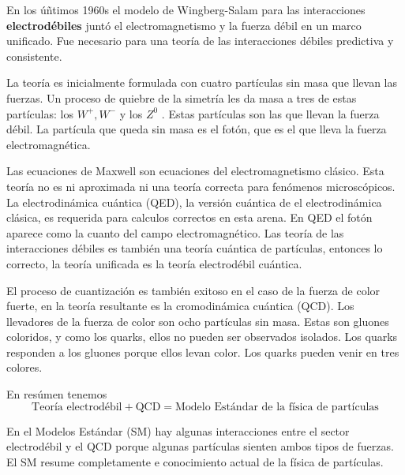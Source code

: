 En los úñtimos 1960s el modelo de Wingberg-Salam para las interacciones \textbf{electrodébiles} juntó el electromagnetismo y la fuerza débil en un marco unificado. Fue necesario para una teoría de las interacciones débiles predictiva y consistente.

La teoría es inicialmente formulada con cuatro partículas sin masa que llevan las fuerzas. Un proceso de quiebre de la simetría les da masa a tres de estas partículas: los $W^+, W^-$ y los $Z^0$ . Estas partículas son las que llevan la fuerza débil. La partícula que queda sin masa es el fotón, que es el que lleva la fuerza electromagnética.

Las ecuaciones de Maxwell son ecuaciones del electromagnetismo clásico. Esta teoría no es ni aproximada ni una teoría correcta para fenómenos microscópicos. La electrodinámica cuántica (QED), la versión cuántica de el electrodinámica clásica, es requerida para calculos correctos en esta arena. En QED el fotón aparece como la cuanto del campo electromagnético. Las teoría de las interacciones débiles es también una teoría cuántica de partículas, entonces lo correcto, la teoría unificada es la teoría electrodébil cuántica.

El proceso de cuantización es también exitoso en el caso de la fuerza de color fuerte, en la teoría resultante es la cromodinámica cuántica (QCD). Los llevadores de la fuerza de color son ocho partículas sin masa. Estas son gluones coloridos, y como los quarks, ellos no pueden ser observados isolados.  Los quarks responden a los gluones porque ellos levan color. Los quarks pueden venir en tres colores.

En resúmen tenemos
\begin{equation}
    \text{Teoría electrodébil} + \text{QCD} = \text{Modelo Estándar de la física de partículas}
\end{equation}

En el Modelos Estándar (SM) hay algunas interacciones entre el sector electrodébil y el QCD porque algunas partículas sienten ambos tipos de fuerzas. El SM resume completamente e conocimiento actual de la física de partículas.

